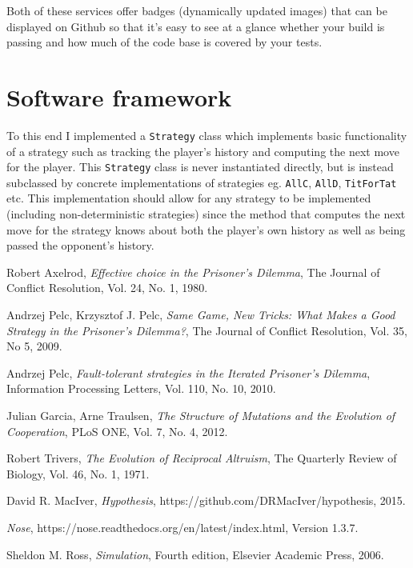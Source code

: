 \documentclass[a4paper,12pt]{article}
\begin{document}
Both of these services offer badges (dynamically updated images) that can be displayed on Github so that it's easy to see at a glance whether your build is passing and how much of the code base is covered by your tests.

\section{Software framework}

To this end I implemented a \texttt{Strategy} class which implements basic functionality of a strategy such as tracking the player's history and computing the next move for the player.
This \texttt{Strategy} class is never instantiated directly, but is instead subclassed by concrete implementations of strategies eg. \texttt{AllC}, \texttt{AllD}, \texttt{TitForTat} etc.
This implementation should allow for any strategy to be implemented (including non-deterministic strategies) since the method that computes the next move for the strategy knows about both the player's own history as well as being passed the opponent's history.


\begin{thebibliography}{9}

        Robert Axelrod,
        \emph{Effective choice in the Prisoner's Dilemma},
        The Journal of Conflict Resolution,
        Vol. 24,
        No. 1,
        1980.

        Andrzej Pelc, Krzysztof J. Pelc,
        \emph{Same Game, New Tricks: What Makes a Good Strategy in the Prisoner's Dilemma?},
        The Journal of Conflict Resolution,
        Vol. 35,
        No 5,
        2009.

        Andrzej Pelc,
        \emph{Fault-tolerant strategies in the Iterated Prisoner's Dilemma},
        Information Processing Letters,
        Vol. 110,
        No. 10,
        2010.

        Julian Garcia, Arne Traulsen,
        \emph{The Structure of Mutations and the Evolution of Cooperation},
        PLoS ONE,
        Vol. 7,
        No. 4,
        2012.

        Robert Trivers,
        \emph{The Evolution of Reciprocal Altruism},
        The Quarterly Review of Biology,
        Vol. 46,
        No. 1,
        1971.

        David R. MacIver,
        \emph{Hypothesis},
        https://github.com/DRMacIver/hypothesis,
        2015.

        \emph{Nose},
        https://nose.readthedocs.org/en/latest/index.html,
        Version 1.3.7.


        Sheldon M. Ross,
        \emph{Simulation},
        Fourth edition,
        Elsevier Academic Press,
        2006.

\end{thebibliography}
\end{document}
